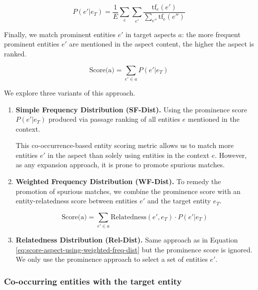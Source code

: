     \begin{equation}
    \label{eq:prominence}
        P(e' \vert e_T) =  \frac{1}{E} \sum_e  \sum_{e'} \frac{\text{tf}_{e}(e')}{\sum_{e''}\text{tf}_{e}(e'')}
    \end{equation}



Finally, we match prominent entities $e'$ in target aspects $a$: the more frequent  prominent entities $e'$ are mentioned in the aspect content, the higher the aspect is ranked. 

    \begin{equation}
    \label{eq:score-aspect-using-simple-freq-dist}
        \text{Score(a)} = \sum_{e' \in a}P(e' \vert e_T)
    \end{equation}



We explore three variants of this approach.

\begin{enumerate}
     \item \textbf{Simple Frequency Distribution (SF-Dist).}
     Using the prominence score $P(e' \vert e_T)$ produced via passage ranking of all entities $e$ mentioned in the context.

This co-occurrence-based entity scoring metric allows us to match more entities $e'$ in the aspect than solely using entities in the context $e$. However, as any expansion approach, it is prone to promote spurious matches. 
 
 \item \textbf{Weighted Frequency Distribution (WF-Dist).} 
 To remedy the promotion of spurious matches, we combine the prominence score with an entity-relatedness score between entities $e'$ and the target entity $e_T$.
 
 \begin{equation}
         \label{eq:score-aspect-using-weighted-freq-dist}
        \text{Score(a)} = \sum_{e' \in a} \text{Relatedness}(e', e_T) \cdot P(e' \vert e_T)
    \end{equation}


\item \textbf{Relatedness Distribution (Rel-Dist).} 
Same approach as in Equation  \ref{eq:score-aspect-using-weighted-freq-dist} but the prominence score is ignored. We only use the prominence approach to select a set of entities $e'$. 

\end{enumerate}

\subsubsection{Co-occurring entities with the target entity} 
\label{subsubsec:Co-occurring entities with the target entity}

